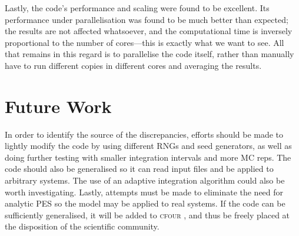 Lastly, the code's performance and scaling were found to be excellent. Its performance under parallelisation was found to be much better than expected; the results are not affected whatsoever, and the computational time is inversely proportional to the number of cores---this is exactly what we want to see. All that remains in this regard is to parallelise the code itself, rather than manually have to run different copies in different cores and averaging the results.
%
\section{Future Work}
%
In order to identify the source of the discrepancies, efforts should be made to lightly modify the code by using different RNGs and seed generators, as well as doing further testing with smaller integration intervals and more MC reps. The code should also be generalised so it can read input files and be applied to arbitrary systems. The use of an adaptive integration algorithm could also be worth investigating. Lastly, attempts must be made to eliminate the need for analytic PES so the model may be applied to real systems. If the code can be sufficiently generalised, it will be added to \textsc{cfour} \cite{cfour}, and thus be freely placed at the disposition of the scientific community.
%
